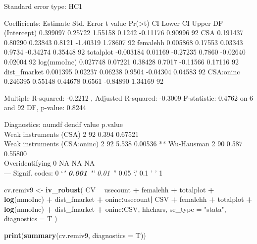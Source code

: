 \documentclass[
]{article}
\newenvironment{Shaded}{\begin{snugshade}}{\end{snugshade}}
\newcommand{\DataTypeTok}[1]{\textcolor[rgb]{0.13,0.29,0.53}{#1}}
\newcommand{\KeywordTok}[1]{\textcolor[rgb]{0.13,0.29,0.53}{\textbf{#1}}}
\newcommand{\NormalTok}[1]{#1}
\newcommand{\OperatorTok}[1]{\textcolor[rgb]{0.81,0.36,0.00}{\textbf{#1}}}
\newcommand{\StringTok}[1]{\textcolor[rgb]{0.31,0.60,0.02}{#1}}
\begin{document}
Standard error type: HC1

Coefficients: Estimate Std. Error t value
Pr(\textgreater\textbar t\textbar) CI Lower CI Upper DF (Intercept)
0.399097 0.25722 1.55158 0.1242 -0.11176 0.90996 92 CSA 0.191437 0.80290
0.23843 0.8121 -1.40319 1.78607 92 femalehh 0.005868 0.17553 0.03343
0.9734 -0.34274 0.35448 92 totalplot -0.003184 0.01169 -0.27235 0.7860
-0.02640 0.02004 92 log(mmoInc) 0.027748 0.07221 0.38428 0.7017 -0.11566
0.17116 92 dist\_fmarket 0.001395 0.02237 0.06238 0.9504 -0.04304
0.04583 92 CSA:oninc 0.246395 0.55148 0.44678 0.6561 -0.84890 1.34169 92

Multiple R-squared: -0.2212 , Adjusted R-squared: -0.3009 F-statistic:
0.4762 on 6 and 92 DF, p-value: 0.8244

Diagnostics: numdf dendf value p.value\\
Weak instruments (CSA) 2 92 0.394 0.67521\\
Weak instruments (CSA:oninc) 2 92 5.538 0.00536 ** Wu-Hausman 2 90 0.587
0.55800\\
Overidentifying 0 NA NA NA\\
--- Signif. codes: 0 `\emph{\textbf{' 0.001 '}' 0.01 '}' 0.05 `.' 0.1 '
' 1

\begin{Shaded}
\begin{Highlighting}[]
\NormalTok{cv.remiv9 <-}
\StringTok{  }\KeywordTok{iv_robust}\NormalTok{(}
\NormalTok{    CV }\OperatorTok{~}\StringTok{ }\NormalTok{usecount }\OperatorTok{+}\StringTok{ }\NormalTok{femalehh }\OperatorTok{+}\StringTok{ }\NormalTok{totalplot }\OperatorTok{+}\StringTok{ }\KeywordTok{log}\NormalTok{(mmoInc) }\OperatorTok{+}\StringTok{ }\NormalTok{dist_fmarket }\OperatorTok{+}\StringTok{ }\NormalTok{oninc}\OperatorTok{:}\NormalTok{usecount}\OperatorTok{|}
\StringTok{      }\NormalTok{CSV }\OperatorTok{+}\StringTok{ }\NormalTok{femalehh }\OperatorTok{+}\StringTok{ }\NormalTok{totalplot }\OperatorTok{+}\StringTok{ }\KeywordTok{log}\NormalTok{(mmoInc) }\OperatorTok{+}\StringTok{ }\NormalTok{dist_fmarket }\OperatorTok{+}\StringTok{ }\NormalTok{oninc}\OperatorTok{:}\NormalTok{CSV,}
\NormalTok{    hhchars,}
    \DataTypeTok{se_type =} \StringTok{"stata"}\NormalTok{,}
    \DataTypeTok{diagnostics =}\NormalTok{ T}
\NormalTok{  )}

\KeywordTok{print}\NormalTok{(}\KeywordTok{summary}\NormalTok{(cv.remiv9, }\DataTypeTok{diagnostics =}\NormalTok{ T))}
\end{Highlighting}
\end{Shaded}
\end{document}

